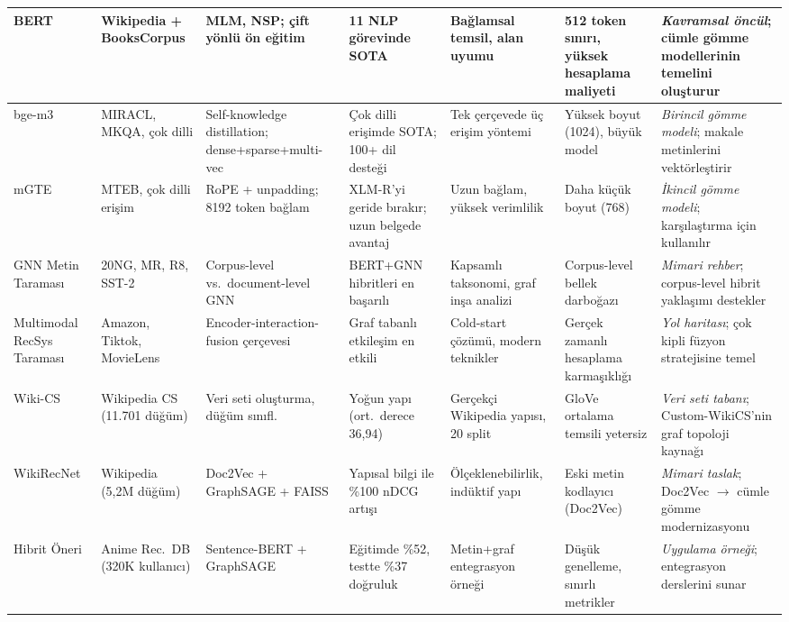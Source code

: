\documentclass[12pt, a4paper]{article}
\begin{document}
\begin{landscape}
\begin{longtable}{|p{2.0cm}|p{2.0cm}|p{2.8cm}|p{3.5cm}|p{3.0cm}|p{3.0cm}|p{3.8cm}|}
BERT \cite{devlin2019bert} &
Wikipedia + BooksCorpus &
MLM, NSP; çift yönlü ön eğitim &
11 NLP görevinde SOTA &
Bağlamsal temsil, alan uyumu &
512 token sınırı, yüksek hesaplama maliyeti &
\textit{Kavramsal öncül}; cümle gömme modellerinin temelini oluşturur \\
\hline

bge-m3 \cite{chen2025bgem3} &
MIRACL, MKQA, çok dilli &
Self-knowledge distillation; dense+sparse+multi-vec &
Çok dilli erişimde SOTA; 100+ dil desteği &
Tek çerçevede üç erişim yöntemi &
Yüksek boyut (1024), büyük model &
\textit{Birincil gömme modeli}; makale metinlerini vektörleştirir \\
\hline

mGTE \cite{zhang2024mgte} &
MTEB, çok dilli erişim &
RoPE + unpadding; 8192 token bağlam &
XLM-R'yi geride bırakır; uzun belgede avantaj &
Uzun bağlam, yüksek verimlilik &
Daha küçük boyut (768) &
\textit{İkincil gömme modeli}; karşılaştırma için kullanılır \\
\hline

GNN Metin Taraması \cite{li2022graph} &
20NG, MR, R8, SST-2 &
Corpus-level vs.\ document-level GNN &
BERT+GNN hibritleri en başarılı &
Kapsamlı taksonomi, graf inşa analizi &
Corpus-level bellek darboğazı &
\textit{Mimari rehber}; corpus-level hibrit yaklaşımı destekler \\
\hline

Multimodal RecSys Taraması \cite{zhou2023multimodal} &
Amazon, Tiktok, MovieLens &
Encoder-interaction-fusion çerçevesi &
Graf tabanlı etkileşim en etkili &
Cold-start çözümü, modern teknikler &
Gerçek zamanlı hesaplama karmaşıklığı &
\textit{Yol haritası}; çok kipli füzyon stratejisine temel \\
\hline

Wiki-CS \cite{mernyei2020wikics} &
Wikipedia CS (11.701 düğüm) &
Veri seti oluşturma, düğüm sınıfl. &
Yoğun yapı (ort.\ derece 36,94) &
Gerçekçi Wikipedia yapısı, 20 split &
GloVe ortalama temsili yetersiz &
\textit{Veri seti tabanı}; Custom-WikiCS'nin graf topoloji kaynağı \\
\hline

WikiRecNet \cite{wikirecnet2020} &
Wikipedia (5,2M düğüm) &
Doc2Vec + GraphSAGE + FAISS &
Yapısal bilgi ile \%100 nDCG artışı &
Ölçeklenebilirlik, indüktif yapı &
Eski metin kodlayıcı (Doc2Vec) &
\textit{Mimari taslak}; Doc2Vec $\to$ cümle gömme modernizasyonu \\
\hline

Hibrit Öneri \cite{anime_hybrid_gnn_bert} &
Anime Rec.\ DB (320K kullanıcı) &
Sentence-BERT + GraphSAGE &
Eğitimde \%52, testte \%37 doğruluk &
Metin+graf entegrasyon örneği &
Düşük genelleme, sınırlı metrikler &
\textit{Uygulama örneği}; entegrasyon derslerini sunar \\
\hline

\end{longtable}
\end{landscape}
\end{document}
